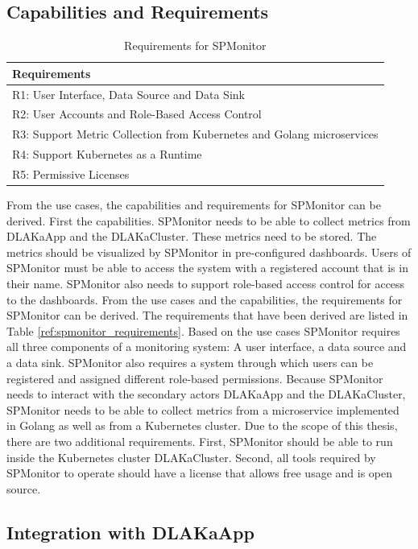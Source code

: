 \subsection{Capabilities and Requirements}

\begin{table}[]
\centering
\begin{tabular}{l}
Requirements \\
\hline
R1: User Interface, Data Source and Data Sink \\
R2: User Accounts and Role-Based Access Control \\
R3: Support Metric Collection from Kubernetes and Golang microservices \\
R4: Support Kubernetes as a Runtime \\
R5: Permissive Licenses \\
\end{tabular}
\caption{Requirements for SPMonitor}
\label{tab:spmonitor_requirements}
\end{table}

From the use cases, the capabilities and requirements for SPMonitor can be derived.
First the capabilities. SPMonitor needs to be able to collect metrics from DLAKaApp and the DLAKaCluster.
These metrics need to be stored. The metrics should be visualized by SPMonitor in pre-configured dashboards.
Users of SPMonitor must be able to access the system with a registered account that is in their name.
SPMonitor also needs to support role-based access control for access to the dashboards.
From the use cases and the capabilities, the requirements for SPMonitor can be derived.
The requirements that have been derived are listed in Table \ref{ref:spmonitor_requirements}.
Based on the use cases SPMonitor requires all three components of a monitoring system: A user interface, a data source
and a data sink. SPMonitor also requires a system through which users can be registered and assigned different role-based
permissions. Because SPMonitor needs to interact with the secondary actors DLAKaApp and the DLAKaCluster,
SPMonitor needs to be able to collect metrics from a microservice implemented in Golang as well as from
a Kubernetes cluster. Due to the scope of this thesis, there are two additional requirements.
First, SPMonitor should be able to run inside the Kubernetes cluster DLAKaCluster.
Second, all tools required by SPMonitor to operate should have a license that allows free usage
and is open source.

\subsection{Integration with DLAKaApp}

